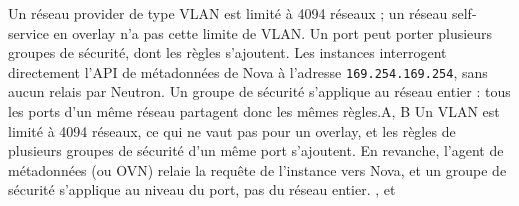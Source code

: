   {Un réseau provider de type VLAN est limité à 4094 réseaux ; un réseau self-service en overlay n'a pas cette limite de VLAN.}
  {Un port peut porter plusieurs groupes de sécurité, dont les règles s'ajoutent.}
  {Les instances interrogent directement l'API de métadonnées de Nova à l'adresse \texttt{169.254.169.254}, sans aucun relais par Neutron.}
  {Un groupe de sécurité s'applique au réseau entier : tous les ports d'un même réseau partagent donc les mêmes règles.}{A, B}
  {Un VLAN est limité à 4094 réseaux, ce qui ne vaut pas pour un overlay, et les règles de plusieurs groupes de sécurité d'un même port s'ajoutent. En revanche, l'agent de métadonnées (ou OVN) relaie la requête de l'instance vers Nova, et un groupe de sécurité s'applique au niveau du port, pas du réseau entier.}
  {,  et }

